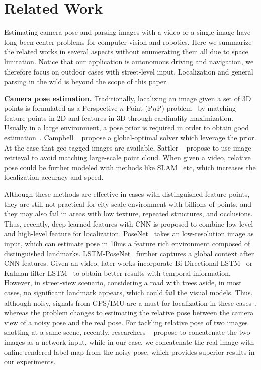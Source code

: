 \vspace{-0.6\baselineskip}
\section{Related Work}
\vspace{-0.5\baselineskip}
\label{sec:related_work}
Estimating camera pose and parsing images with a video or a single image have long been center problems for computer vision and robotics.
Here we summarize the related works in several aspects without enumerating them all due to space limitation.
Notice that our application is autonomous driving and navigation, we therefore focus on outdoor cases with street-level input. Localization and general parsing in the wild is beyond the scope of this paper.

\textbf{Camera pose estimation.} Traditionally, localizing an image given a set of 3D points is formulated as a Perspective-$n$-Point (P$n$P) problem~\cite{haralick1994review,kneip2014upnp} by matching feature points in 2D and features in 3D through cardinality maximization. Usually in a large environment, a pose prior is required in order to obtain good estimation~\cite{david2004softposit,moreno2008pose}. Campbell \etal~\cite{campbell2017globally} propose a global-optimal solver which leverage the prior. At the case that geo-tagged images are available, Sattler \etal~\cite{sattler2017large} propose to use image-retrieval to avoid matching large-scale point cloud.
When given a video, relative pose could be further modeled with methods like SLAM~\cite{engel2014lsd} etc, which increases the localization accuracy and speed.

Although these methods are effective in cases with distinguished feature points, they are still not practical for city-scale environment with billions of points, and they may also fail in areas with low texture, repeated structures, and occlusions.
Thus, recently, deep learned features with CNN is proposed to combine low-level and high-level feature for localization. PoseNet~\cite{Kendall_2015_ICCV,kendall2017geometric} takes an low-resolution image as input, which can estimate pose in 10ms \wrt a feature rich environment composed of distinguished landmarks. LSTM-PoseNet~\cite{hazirbasimage} further captures a global context after CNN features.
Given an video, later works incorporate Bi-Directional LSTM~\cite{DBLP:journals/corr/ClarkWMTW17} or Kalman filter LSTM~\cite{coskun2017long} to obtain better results with temporal information. However, in street-view scenario, considering a road with trees aside, in most cases, no significant landmark appears, which could fail the visual models. Thus, although noisy, signals from GPS/IMU are a must for localization in these cases~\cite{vishal2015accurate}, whereas the problem changes to estimating the relative pose between the camera view of a noisy pose and the real pose. For tackling relative pose of two images shotting at a same scene, recently, researchers ~\cite{laskar2017camera,ummenhofer2016demon} propose to concatenate the two images as a network input, while in our case, we concatenate the real image with online rendered label map from the noisy pose, which provides superior results in our experiments.

